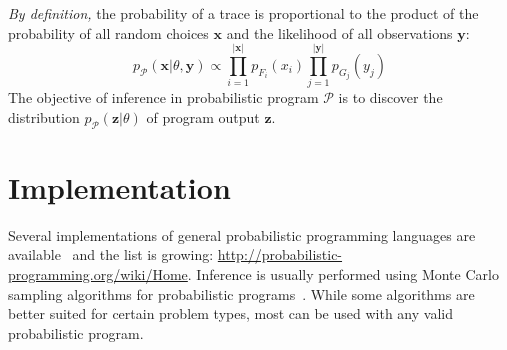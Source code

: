 \documentclass[a4paper,oneside]{article}
\begin{document}
\emph{By definition,} the probability of a trace is proportional
to the product of the probability of all random choices
$\pmb{x}$ and the likelihood of all observations $\pmb{y}$:
\begin{equation}
	p_{\mathcal{P}}(\pmb{x}|\theta,\pmb{y}) \propto \prod_{i=1}^{\left|\pmb{x}\right|} p_{F_i}(x_i) \prod_{j=1}^{\left|\pmb{y}\right|}p_{G_j}(y_{j})
  \label{eqn:p-trace}
\end{equation}
The objective of inference in probabilistic program
$\mathcal{P}$ is to discover the distribution
$p_{\mathcal{P}}(\pmb{z}|\theta)$ of program output $\pmb{z}$.

\section*{Implementation}

Several implementations of general probabilistic programming
languages are available~\cite{GMR+08,MSP14,WVM14} and the list
is growing: \url{http://probabilistic-programming.org/wiki/Home}.
Inference is usually performed using Monte Carlo sampling
algorithms for probabilistic programs~\cite{WSG11,WVM14,PWD+14}.
While some algorithms are better suited for certain problem
types, most can be used with any valid probabilistic program.



\end{document}
